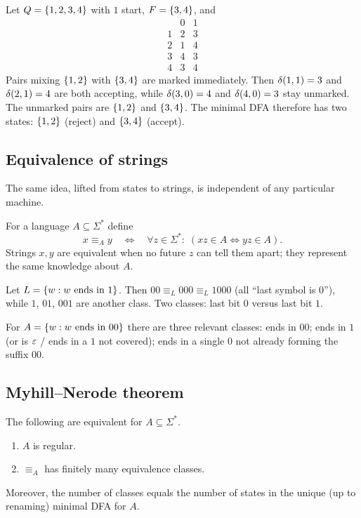 \begin{example}
Let $Q=\{1,2,3,4\}$ with $1$ start, $F=\{3,4\}$, and
\[
\begin{array}{c|cc}
 & 0 & 1\\
\hline
1 & 2 & 3\\
2 & 1 & 4\\
3 & 4 & 3\\
4 & 3 & 4
\end{array}
\]
Pairs mixing $\{1,2\}$ with $\{3,4\}$ are marked immediately. Then
$\delta(1,1)=3$ and $\delta(2,1)=4$ are both accepting, while
$\delta(3,0)=4$ and $\delta(4,0)=3$ stay unmarked. The unmarked
pairs are $\{1,2\}$ and $\{3,4\}$. The minimal DFA therefore has two
states: $\{1,2\}$ (reject) and $\{3,4\}$ (accept).
\end{example}

\subsection{Equivalence of strings}
The same idea, lifted from states to strings, is independent of any particular
machine.

\begin{definition}
For a language $A\subseteq\Sigma^*$ define
\[
  x\equiv_A y
  \quad\Longleftrightarrow\quad
  \forall z\in\Sigma^*:\;
  (xz\in A\iff yz\in A).
\]
Strings $x,y$ are equivalent when no future $z$ can tell them apart; they
represent the same knowledge about $A$.
\end{definition}

\begin{example}
Let $L=\{w:w\text{ ends in }1\}$. Then
$00\equiv_L 000\equiv_L 1000$ (all ``last symbol is $0$''), while
$1$, $01$, $001$ are another class. Two classes: last bit $0$ versus last
bit $1$.

For $A=\{w:w\text{ ends in }00\}$ there are three relevant classes:
ends in $00$; ends in $1$ (or is $\varepsilon$ / ends in a $1$ not covered); ends
in a single $0$ not already forming the suffix $00$.
\end{example}

\subsection{Myhill--Nerode theorem}
\begin{theorem}
The following are equivalent for $A\subseteq\Sigma^*$.
\begin{enumerate}
  \item $A$ is regular.
  \item $\equiv_A$ has finitely many equivalence classes.
\end{enumerate}
Moreover, the number of classes equals the number of states in the unique
(up to renaming) minimal DFA for $A$.
\end{theorem}

